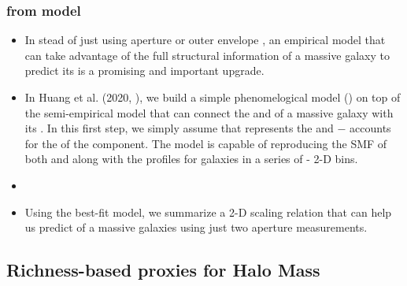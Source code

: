 \documentclass[a4paper,fleqn,usenatbib]{mnras}
\begin{document}
\subsubsection{\mvir{} from \asap{} model}
    \label{sec:masap}


    \begin{itemize}
        
        \item In stead of just using aperture or outer envelope \mstar{}, an empirical model that 
            can take advantage of the full structural information of a massive galaxy to predict 
            its \mvir{} is a promising and important upgrade.
        
        \item In Huang et al. (2020, \addref{}), we build a simple phenomelogical model (\asap{})
            on top of the \um{} semi-empirical model that can connect the \minn{} and \mmax{} of a 
            massive galaxy with its \mvir{}.
            In this first step, we simply assume that  represents the \insitu{} \mstar{}
            and \mmax{}$-$ accounts for the \mstar{} of the \exsitu{} component.
            The model is capable of reproducing the SMF of both \mmax{} and  along with 
            the \dsigma{} profiles for galaxies in a series of \mmax{}- 2-D bins.
        
        \item {}

        \item {} Using the best-fit model, we summarize a 2-D scaling relation that 
            can help us predict \mvir{} of a massive galaxies using just two aperture \mstar{}
            measurements.
        
    \end{itemize}

\subsection{Richness-based proxies for Halo Mass}
	\label{sec:proxy_richness}
\end{document}

